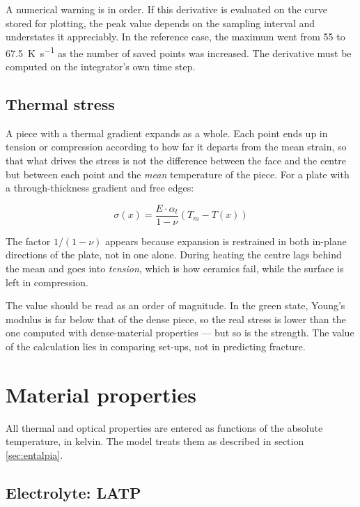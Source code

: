\documentclass[11pt,a4paper]{article}
\begin{document}
A numerical warning is in order. If this derivative is evaluated on the
curve stored for plotting, the peak value depends on the sampling interval
and understates it appreciably. In the reference case, the maximum went
from \num{55} to \SI{67.5}{\kelvin\per\second} as the number of saved
points was increased. The derivative must be computed on the integrator's
own time step.

\subsection{Thermal stress}

A piece with a thermal gradient expands as a whole. Each point ends up in
tension or compression according to how far it departs from the mean
strain, so that what drives the stress is not the difference between the
face and the centre but between each point and the \emph{mean} temperature
of the piece. For a plate with a through-thickness gradient and free edges:

\begin{equation}
\boxed{\;
\sigma(x) = \frac{E \cdot \alpha_{t}}{1 - \nu}
\left( T_{m} - T(x) \right)
\;}
\end{equation}

The factor $1/(1-\nu)$ appears because expansion is restrained in both
in-plane directions of the plate, not in one alone. During heating the
centre lags behind the mean and goes into \emph{tension}, which is how
ceramics fail, while the surface is left in compression.

The value should be read as an order of magnitude. In the green state,
Young's modulus is far below that of the dense piece, so the real stress is
lower than the one computed with dense-material properties --- but so is
the strength. The value of the calculation lies in comparing set-ups, not
in predicting fracture.

\section{Material properties}
\label{sec:propiedades}

All thermal and optical properties are entered as functions of the absolute
temperature, in kelvin. The model treats them as described in
section \ref{sec:entalpia}.

\subsection{Electrolyte: LATP}
\end{document}
